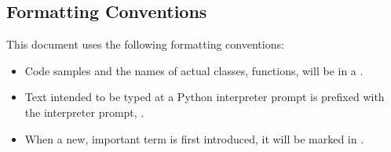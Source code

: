 \subsection{Formatting Conventions}

This document uses the following formatting conventions:

\begin{itemize}

\item Code samples and the names of actual classes, functions, will be in a
.

\item Text intended to be typed at a Python interpreter prompt is prefixed 
with the interpreter prompt, \samp{>>>}.

\item When a new, important term is first introduced, it will be marked
in .

\end{itemize}


